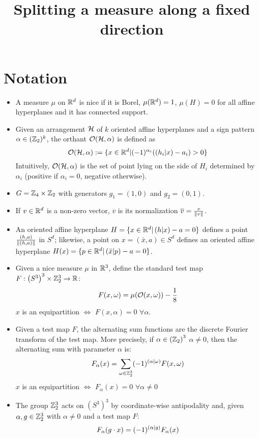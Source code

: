 \documentclass[10pt]{article}
\title{Splitting a measure along a fixed direction}
\author{}
\begin{document}
\maketitle
\section*{Notation}
\begin{itemize}
\item A measure $\mu$ on $\mathbb{R}^d$ is nice if it is Borel, $\mu(\mathbb{R}^d)=1$, $\mu(H) = 0$ for all affine hyperplanes and it has connected support.
\item Given an arrangement $\mathcal{H}$ of $k$ oriented affine hyperplanes and a sign pattern $\alpha\in (\mathbb{Z}_2)^k$, the orthant $\mathcal{O}(\mathcal{H}, \alpha)$ is defined as
  \[
    \mathcal{O}(\mathcal{H}, \alpha) := \{x\in \mathbb{R}^d \vert (-1)^{\alpha_i}(\left( h_i \vert x\right) - a_i) > 0 \}
  \]
  Intuitively, $\mathcal{O}(\mathcal{H}, \alpha)$ is the set of point lying on the side of $H_i$ determined by $\alpha_i$ (positive if $\alpha_i=0$, negative otherwise).
\item $G= \mathbb{Z}_4\times \mathbb{Z}_2$ with generators $g_1 = (1,0)$ and $g_2=(0, 1)$.
\item If $v\in \mathbb{R}^d$ is a non-zero vector, $\overline{v}$ is its normalization $\overline{v}=\frac{v}{\lVert v \rVert}$.
\item An oriented affine hyperplane $H = \{x\in \mathbb{R}^d \vert \left( h \vert x\right) - a =0 \}$ defines a point $\frac{(h, a)}{\lVert (h,a) \rVert}$ in $S^d$; likewise, a point on $x = (\bar x, a)\in S^d$ defines an oriented affine hyperplane $H(x) = \{p\in \mathbb{R}^d \vert \left( \bar x \vert p\right) -a = 0 \}$.
\item Given a nice measure $\mu$ in $\mathbb{R}^3$, define the standard test map $F:\left(S^3 \right)^3 \times \mathbb{Z}_2^3  \rightarrow \mathbb{R}$:
  \[
    F(x, \omega) = \mu(\mathcal{O}(x, \omega))  - \frac{1}{8}
  \]
  $x$ is an equipartition $\iff$ $F(x, \alpha) = 0$ $\forall \alpha$.
\item Given a test map $F$, the alternating sum functions are the discrete Fourier transform of the test map. More precisely, if $\alpha \in \left( \mathbb{Z}_2\right)^3$
  $\alpha \neq 0$, then the alternating sum with parameter $\alpha$ is:
  \[
    F_\alpha(x) = \sum_{\omega\in \mathbb{Z}_2^3} (-1)^{\left( \alpha \vert \omega\right)} F(x, \omega)
  \]
  $x$ is an equipartition $\iff$ $F_\alpha(x) = 0$ $\forall \alpha \neq 0$
\item The group $\mathbb{Z}_2^3$ acts on $\left(S^3 \right)^3$ by coordinate-wise antipodality and, given $\alpha, g \in \mathbb{Z}_2^3$ with $\alpha\neq 0$ and a test map $F$:
  \[
    F_\alpha(g\cdot x) = (-1)^{\left( \alpha \vert g\right)}F_\alpha(x)
  \]
\end{itemize}
\end{document}
